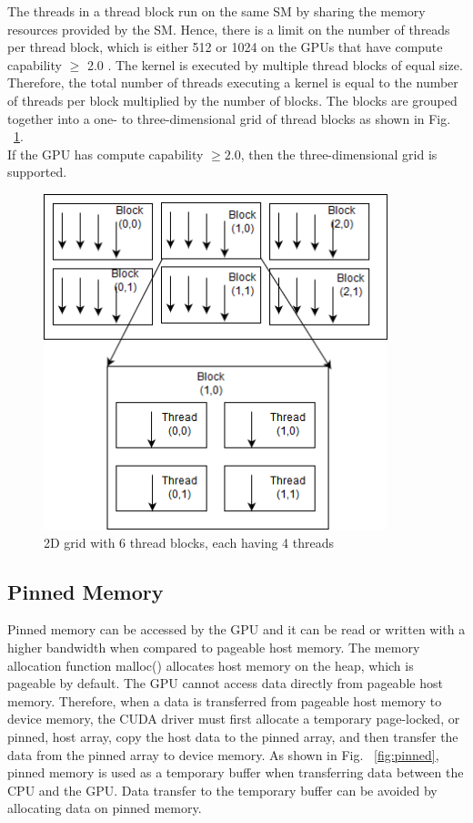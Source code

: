 The threads in a thread block run on the same SM by sharing the memory resources provided by the SM. Hence, there is a limit on the number of threads per thread block, which is either 512 or 1024 on the GPUs that have compute capability \ensuremath{\geq} 2.0 \cite{bib5}. The kernel is executed by multiple thread blocks of equal size. Therefore, the total number of threads executing a kernel is equal to the number of threads per block multiplied by the number of blocks. The blocks are grouped together into a one- to three-dimensional grid of thread blocks as shown in Fig. ~\ref{fig:cudablock}.\\ If the GPU has compute capability \ensuremath{\geq2.0}, then the three-dimensional grid is supported.

\begin{figure}[H]
	\centering
	\includegraphics[width=10cm]{cudablock.png}
	\caption{2D grid with 6 thread blocks, each having 4 threads}
	\label{fig:cudablock}
\end{figure}
\squeezeup

\subsection{Pinned Memory}
Pinned memory can be accessed by the GPU and it can be read or written with a higher bandwidth when compared to pageable host memory. The memory allocation function malloc() allocates host memory on the heap, which is pageable by default. The GPU cannot access data directly from pageable host memory. Therefore, when a data is transferred from pageable host memory to device memory, the CUDA driver must first allocate a temporary page-locked, or pinned, host array, copy the host data to the pinned array, and then transfer the data from the pinned array to device memory. As shown in Fig. ~\ref{fig:pinned}, pinned memory is used as a temporary buffer when transferring data between the CPU and the GPU. Data transfer to the temporary buffer can be avoided by allocating data on pinned memory.

